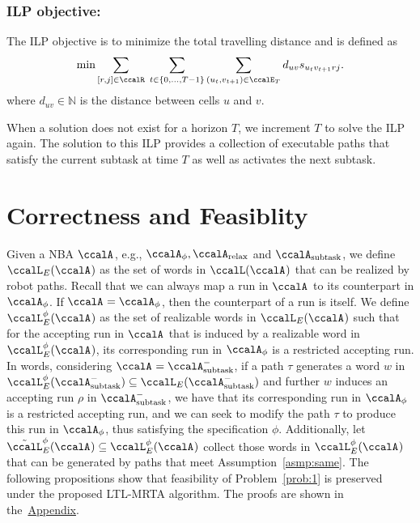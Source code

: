 \documentclass[Afour,sageh,times]{sagej}
\newcommand{\auto}[1]{\ccalA_{\textup{#1}}}
\newcommand{\autop}{\ccalA_{\phi}}
\begin{document}
{{\subsubsection{ILP objective:} The ILP objective is to minimize the total travelling distance and is defined as
\begingroup\makeatletter\def\f@size{10}\check@mathfonts
\def\maketag@@@#1{\hbox{\m@th\normalsize\normalfont#1}}%
\begingroup
\begin{align}
  \text{min} \sum_{[r,j] \in \ccalR} \; \sum_{t\in \{0,\ldots, T-1\}} \sum_{(u_t, v_{t+1}) \in \ccalE_T} d_{uv} s_{u_{t} v_{t+1} r j}   .
\end{align}
\endgroup
where $d_{uv} \in \mathbb{N}$ is the distance between cells $u$ and $v$.

When a solution does not exist for a horizon $T$, we increment $T$ to solve the ILP again.  The solution to this ILP provides  a collection of executable paths that satisfy  the current subtask at time $T$  as well as activates the next subtask.

  \section{Correctness and Feasiblity}\label{sec:correctness}
  Given a NBA $\auto{}$, e.g., $\autop, \auto{relax}$ and $\auto{subtask}$, we define $\ccalL_E(\auto{})$ as the set of words in  $\ccalL(\auto{})$ that can be realized by robot paths. Recall that we can always map a run  in $\auto{}$ to its counterpart in $\autop$. If $\auto{}=\autop$, then the counterpart of a run is itself. We define $\ccalL^\phi_E(\auto{})$ as the set of realizable words in $\ccalL_E(\auto{})$ such that for the accepting run in $\auto{}$ that is induced by a realizable word in $\ccalL^\phi_E(\auto{})$, its corresponding run in $\autop$ is a restricted accepting run. In words, considering $\auto{} = \auto{subtask}^-$, if a path $\tau$ generates a word $w$ in $\ccalL_E^\phi(\auto{subtask}^-) \subseteq \ccalL_E(\auto{subtask}^-)$ and further $w$ induces an accepting run $\rho$ in $\auto{subtask}^-$, we have that its corresponding run  in $\autop$ is a restricted accepting run, and we can seek to modify the path $\tau$  to produce this run  in $\autop$, thus satisfying the specification $\phi$.  Additionally, let $\tilde{\ccalL}^{\phi}_E(\auto{}) \subseteq \ccalL^{\phi}_E(\auto{})$ collect those words in $\ccalL^{\phi}_E(\auto{})$ that can be generated by paths that meet Assumption~\ref{asmp:same}.  The following propositions show that feasibility of Problem~\ref{prob:1} is preserved under the proposed LTL-MRTA algorithm. The proofs are shown in the~\hyperref[sec:appendix]{Appendix}.

}}
\end{document}
